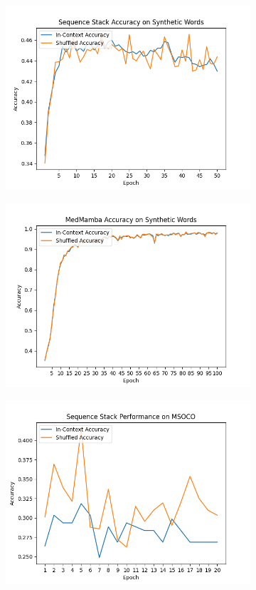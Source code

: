 \begin{figure}[!ht]
\begin{subfigure}{0.5\textwidth}
        \includegraphics[width=\textwidth]{figures/sequence_stack_words.png}
    \end{subfigure}\begin{subfigure}{0.5\textwidth}
        \includegraphics[width=\textwidth]{figures/medmamba_words.png}
    \end{subfigure}
    \begin{subfigure}{0.5\textwidth}
        \includegraphics[width=\textwidth]{figures/sequence_stack_mscoco.png}

\end{subfigure}
\end{figure}
